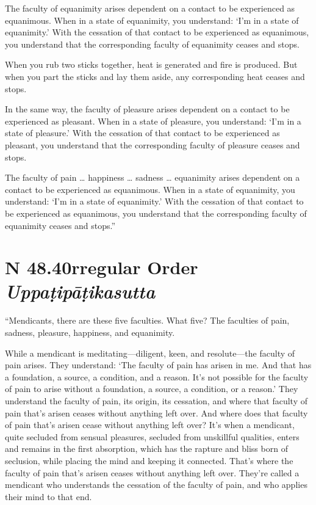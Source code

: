 \documentclass[12pt,openany]{book}%
\newcommand*{\suttatitleacronym}[1]{\smaller[2]{#1}\vspace*{.3em}}
\newcommand*{\suttatitletranslation}[1]{\linebreak{#1}}
\newcommand*{\suttatitleroot}[1]{\linebreak\smaller[2]\itshape{#1}}
\newcommand*{\tocacronym}[1]{\hspace*{-3.3em}{#1}\quad}
\newcommand*{\toctranslation}[1]{#1}
\newcommand*{\tocroot}[1]{(\textit{#1})}
\begin{document}
The faculty of equanimity arises dependent on a contact to be experienced as equanimous. When in a state of equanimity, you understand: ‘I’m in a state of equanimity.’ With the cessation of that contact to be experienced as equanimous, you understand that the corresponding faculty of equanimity ceases and stops. 

When you rub two sticks together, heat is generated and fire is produced. But when you part the sticks and lay them aside, any corresponding heat ceases and stops. 

In the same way, the faculty of pleasure arises dependent on a contact to be experienced as pleasant. When in a state of pleasure, you understand: ‘I’m in a state of pleasure.’ With the cessation of that contact to be experienced as pleasant, you understand that the corresponding faculty of pleasure ceases and stops. 

The faculty of pain … happiness … sadness … equanimity arises dependent on a contact to be experienced as equanimous. When in a state of equanimity, you understand: ‘I’m in a state of equanimity.’ With the cessation of that contact to be experienced as equanimous, you understand that the corresponding faculty of equanimity ceases and stops.” 

%
\section*{{\suttatitleacronym SN 48.40}{\suttatitletranslation Irregular Order }{\suttatitleroot Uppaṭipāṭikasutta}}
\addcontentsline{toc}{section}{\tocacronym{SN 48.40} \toctranslation{Irregular Order } \tocroot{Uppaṭipāṭikasutta}}

“Mendicants, there are these five faculties. What five? The faculties of pain, sadness, pleasure, happiness, and equanimity. 

While a mendicant is meditating—diligent, keen, and resolute—the faculty of pain arises. They understand: ‘The faculty of pain has arisen in me. And that has a foundation, a source, a condition, and a reason. It’s not possible for the faculty of pain to arise without a foundation, a source, a condition, or a reason.’ They understand the faculty of pain, its origin, its cessation, and where that faculty of pain that’s arisen ceases without anything left over. And where does that faculty of pain that’s arisen cease without anything left over? It’s when a mendicant, quite secluded from sensual pleasures, secluded from unskillful qualities, enters and remains in the first absorption, which has the rapture and bliss born of seclusion, while placing the mind and keeping it connected. That’s where the faculty of pain that’s arisen ceases without anything left over. They’re called a mendicant who understands the cessation of the faculty of pain, and who applies their mind to that end. 
\end{document}
